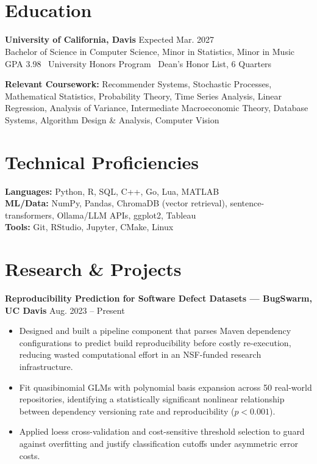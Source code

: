 \documentclass[10.5pt]{article}
\newcommand{\entry}[2]{\textbf{#1} \hfill #2\\}
\begin{document}
\begin{center}
{\LARGE \textbf{\name}}\\[2pt]
\phone\ \textbar\ \href{mailto:\email}{\email}\ \textbar\ \href{https://\linkedin}{\linkedin}\ \textbar\ \href{https://\githubhandle}{\githubhandle}
\end{center}

\section*{Education}
\entry{University of California, Davis}{Expected Mar. 2027}
Bachelor of Science in Computer Science, Minor in Statistics, Minor in Music\\
GPA 3.98 \textbar\ University Honors Program \textbar\ Dean's Honor List, 6 Quarters

\textbf{Relevant Coursework:} Recommender Systems, Stochastic Processes, Mathematical Statistics, Probability Theory, Time Series Analysis, Linear Regression, Analysis of Variance, Intermediate Macroeconomic Theory, Database Systems, Algorithm Design \& Analysis, Computer Vision

\section*{Technical Proficiencies}
\textbf{Languages:} Python, R, SQL, C++, Go, Lua, MATLAB\\
\textbf{ML/Data:} NumPy, Pandas, ChromaDB (vector retrieval), sentence-transformers, Ollama/LLM APIs, ggplot2, Tableau\\
\textbf{Tools:} Git, RStudio, Jupyter, CMake, Linux

\section*{Research \& Projects}

\entry{Reproducibility Prediction for Software Defect Datasets --- BugSwarm, UC Davis}{Aug. 2023 -- Present}
\begin{itemize}
  \item Designed and built a pipeline component that parses Maven dependency configurations to predict build reproducibility before costly re-execution, reducing wasted computational effort in an NSF-funded research infrastructure.
  \item Fit quasibinomial GLMs with polynomial basis expansion across 50 real-world repositories, identifying a statistically significant nonlinear relationship between dependency versioning rate and reproducibility ($p < 0.001$).
  \item Applied loess cross-validation and cost-sensitive threshold selection to guard against overfitting and justify classification cutoffs under asymmetric error costs.
\end{itemize}
\end{document}

